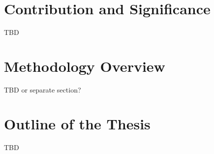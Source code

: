 \section{Contribution and Significance}
\label{sec:contribution}

TBD

\section{Methodology Overview}
\label{sec:methodology_overview}

TBD or separate section?

\section{Outline of the Thesis}
\label{sec:outline}

TBD
